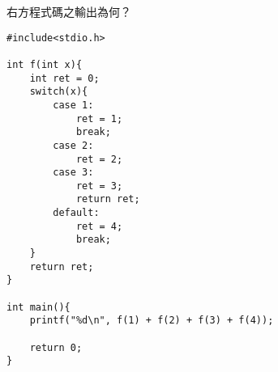 \begin{TestProblem}

\begin{multicols}{2}

右方程式碼之輸出為何？


\columnbreak

\begin{lstlisting}
#include<stdio.h>

int f(int x){
    int ret = 0;
    switch(x){
        case 1:
            ret = 1;
            break;
        case 2:
            ret = 2;
        case 3:
            ret = 3;
            return ret;
        default:
            ret = 4;
            break;
    }
    return ret;
}

int main(){
    printf("%d\n", f(1) + f(2) + f(3) + f(4));

    return 0;
}
\end{lstlisting}

\end{multicols}

\end{TestProblem}